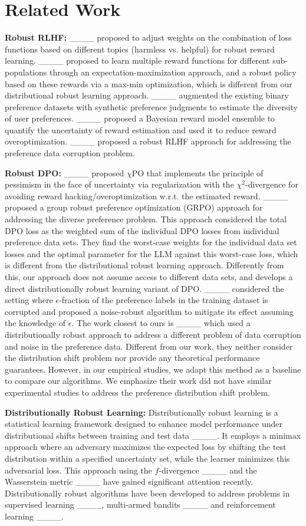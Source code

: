 \section{Related Work}
\textbf{Robust RLHF: } ____ proposed to adjust weights on the combination of loss functions based on different topics (harmless vs. helpful) for robust reward learning. ____ proposed to learn multiple reward functions for different sub-populations through an expectation-maximization approach,  and a robust policy based on these rewards via a max-min optimization, which is different from our distributional robust learning approach. ____ augmented the existing binary preference datasets with synthetic preference judgments to estimate the diversity of user preferences. ____ proposed a Bayesian reward model ensemble to quantify the uncertainty of reward estimation and used it to reduce reward overoptimization. ____ proposed a robust RLHF approach for addressing the preference data corruption problem. 

\textbf{Robust DPO: } ____ proposed $\chi$PO that implements the principle of pessimism in the face of uncertainty via regularization with the $\chi^{2}$-divergence for avoiding reward hacking/overoptimization w.r.t. the estimated reward. ____ proposed a group robust preference optimization (GRPO) approach for addressing the diverse preference problem. This approach considered the total DPO loss as the weighted sum of the individual DPO losses from individual preference data sets. They find the worst-case weights for the individual data set losses and the optimal parameter for the LLM against this worst-case loss, which is different from the distributional robust learning approach. Differently from this, our approach does not assume access to different data sets, and develops a direct distributionally robust learning variant of DPO. ____ considered the setting where  $\epsilon$-fraction of the preference labels in the training dataset is corrupted and proposed a noise-robust algorithm to mitigate its effect assuming the  knowledge of $\epsilon$. The work closest to ours is ____ which used a distributionally robust approach to address a different problem of data corruption and noise in the preference data. Different from our work, they neither consider the distribution shift problem nor provide any theoretical performance guarantees. However, in our empirical studies, we adapt this method as a baseline to compare our algorithms. We emphasize their work did not have similar experimental studies to address the preference distribution shift problem. 

\textbf{Distributionally Robust Learning: } Distributionally robust learning is a statistical learning framework designed to enhance model performance under distributional shifts between training and test data ____. It employs a minimax approach where an adversary maximizes the expected loss by shifting the test distribution within a specified uncertainty set, while the learner minimizes this adversarial loss. This approach using the $f$-divergence ____ and the Wasserstein metric ____ have gained significant attention recently. Distributionally robust algorithms have been developed to address problems in supervised learning ____, multi-armed bandits ____ and reinforcement learning ____.